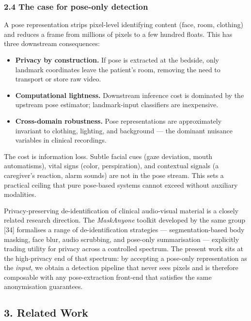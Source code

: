 \documentclass[
  11pt,
]{article}
\providecommand{\tightlist}{%
  \setlength{\itemsep}{0pt}\setlength{\parskip}{0pt}}
\begin{document}
\subsubsection{2.4 The case for pose-only
detection}\label{the-case-for-pose-only-detection}

A pose representation strips pixel-level identifying content (face,
room, clothing) and reduces a frame from millions of pixels to a few
hundred floats. This has three downstream consequences:

\begin{itemize}
\tightlist
\item
  \textbf{Privacy by construction.} If pose is extracted at the bedside,
  only landmark coordinates leave the patient's room, removing the need
  to transport or store raw video.
\item
  \textbf{Computational lightness.} Downstream inference cost is
  dominated by the upstream pose estimator; landmark-input classifiers
  are inexpensive.
\item
  \textbf{Cross-domain robustness.} Pose representations are
  approximately invariant to clothing, lighting, and background --- the
  dominant nuisance variables in clinical recordings.
\end{itemize}

The cost is information loss. Subtle facial cues (gaze deviation, mouth
automatisms), vital signs (color, perspiration), and contextual signals
(a caregiver's reaction, alarm sounds) are not in the pose stream. This
sets a practical ceiling that pure pose-based systems cannot exceed
without auxiliary modalities.

Privacy-preserving de-identification of clinical audio-visual material
is a closely related research direction. The \emph{MaskAnyone} toolkit
developed by the same group {[}34{]} formalises a range of
de-identification strategies --- segmentation-based body masking, face
blur, audio scrubbing, and pose-only summarisation --- explicitly
trading utility for privacy across a controlled spectrum. The present
work sits at the high-privacy end of that spectrum: by accepting a
pose-only representation as the \emph{input}, we obtain a detection
pipeline that never sees pixels and is therefore composable with any
pose-extraction front-end that satisfies the same anonymisation
guarantees.

\subsection{3. Related Work}\label{related-work}
\end{document}

